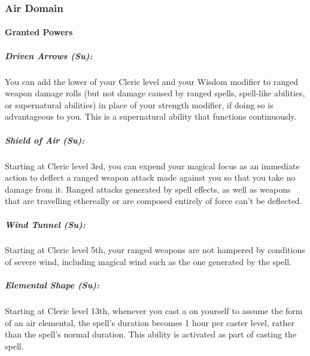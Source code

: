 \subsubsection{Air Domain}
\paragraph{Granted Powers}
\subparagraph{Driven Arrows (Su):} 
You can add the lower of your Cleric level and your Wisdom modifier to ranged weapon damage rolls (but not damage caused by ranged spells, spell-like abilities, or supernatural abilities) in place of your strength modifier, if doing so is advantageous to you. 
This is a supernatural ability that functions continuously.
\subparagraph{Shield of Air (Su):} 
Starting at Cleric level 3rd, you can expend your magical focus as an immediate action to deflect a ranged weapon attack made against you so that you take no damage from it. 
Ranged attacks generated by spell effects, as well as weapons that are travelling ethereally or are composed entirely of force can't be deflected.
\subparagraph{Wind Tunnel (Su):} 
Starting at Cleric level 5th, your ranged weapons are not hampered by conditions of severe wind, including magical wind such as the one generated by the  spell. 
\subparagraph{Elemental Shape (Su):}
Starting at Cleric level 13th, whenever you cast a  on yourself to assume the form of an air elemental, 
the spell's duration becomes 1 hour per caster level, rather than the spell's normal duration.
This ability is activated as part of casting the spell.
